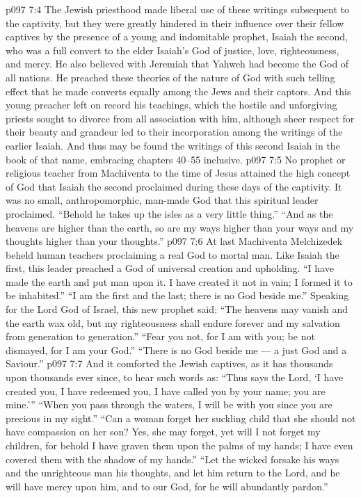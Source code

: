 \vs p097 7:4 The Jewish priesthood made liberal use of these writings subsequent to the captivity, but they were greatly hindered in their influence over their fellow captives by the presence of a young and indomitable prophet, Isaiah the second, who was a full convert to the elder Isaiah’s God of justice, love, righteousness, and mercy. He also believed with Jeremiah that Yahweh had become the God of all nations. He preached these theories of the nature of God with such telling effect that he made converts equally among the Jews and their captors. And this young preacher left on record his teachings, which the hostile and unforgiving priests sought to divorce from all association with him, although sheer respect for their beauty and grandeur led to their incorporation among the writings of the earlier Isaiah. And thus may be found the writings of this second Isaiah in the book of that name, embracing chapters 40--55 inclusive.
\vs p097 7:5 \pc No prophet or religious teacher from Machiventa to the time of Jesus attained the high concept of God that Isaiah the second proclaimed during these days of the captivity. It was no small, anthropomorphic, man\hyp{}made God that this spiritual leader proclaimed. “Behold he takes up the isles as a very little thing.” “And as the heavens are higher than the earth, so are my ways higher than your ways and my thoughts higher than your thoughts.”
\vs p097 7:6 At last Machiventa Melchizedek beheld human teachers proclaiming a real God to mortal man. Like Isaiah the first, this leader preached a God of universal creation and upholding. “I have made the earth and put man upon it. I have created it not in vain; I formed it to be inhabited.” “I am the first and the last; there is no God beside me.” Speaking for the Lord God of Israel, this new prophet said: “The heavens may vanish and the earth wax old, but my righteousness shall endure forever and my salvation from generation to generation.” “Fear you not, for I am with you; be not dismayed, for I am your God.” “There is no God beside me --- a just God and a Saviour.”
\vs p097 7:7 And it comforted the Jewish captives, as it has thousands upon thousands ever since, to hear such words as: “Thus says the Lord, ‘I have created you, I have redeemed you, I have called you by your name; you are mine.’” “When you pass through the waters, I will be with you since you are precious in my sight.” “Can a woman forget her suckling child that she should not have compassion on her son? Yes, she may forget, yet will I not forget my children, for behold I have graven them upon the palms of my hands; I have even covered them with the shadow of my hands.” “Let the wicked forsake his ways and the unrighteous man his thoughts, and let him return to the Lord, and he will have mercy upon him, and to our God, for he will abundantly pardon.”
